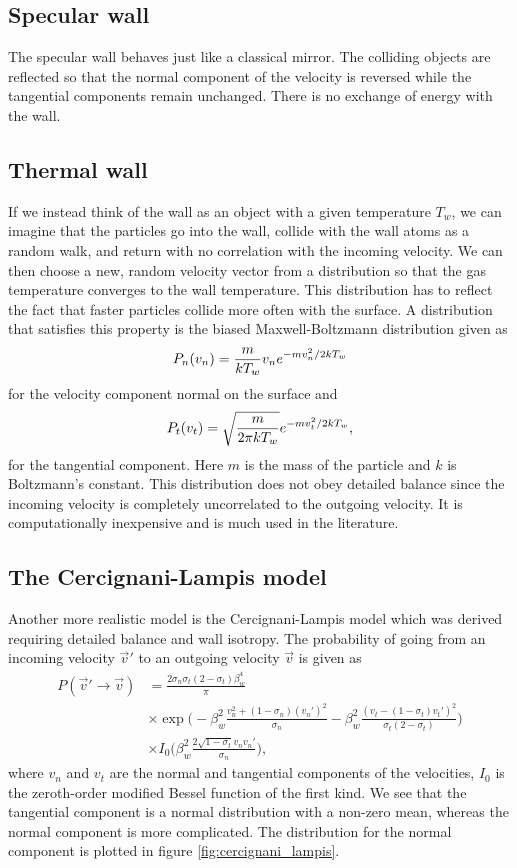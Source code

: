 \subsection{Specular wall}
The specular wall behaves just like a classical mirror. The colliding objects are reflected so that the normal component of the velocity is reversed while the tangential components remain unchanged. There is no exchange of energy with the wall. 

\subsection{Thermal wall}
If we instead think of the wall as an object with a given temperature $T_w$, we can imagine that the particles go into the wall, collide with the wall atoms as a random walk, and return with no correlation with the incoming velocity. We can then choose a new, random velocity vector from a distribution so that the gas temperature converges to the wall temperature. This distribution has to reflect the fact that faster particles collide more often with the surface. A distribution that satisfies this property is the biased Maxwell-Boltzmann distribution given as
\begin{align}
	P_n(v_n) = {m\over kT_w}v_n e^{-mv_n^2/2kT_w}
\end{align}
for the velocity component normal on the surface and
\begin{align}
	P_t(v_t) = \sqrt{m\over 2\pi kT_w}e^{-mv_t^2/2kT_w},
\end{align}
for the tangential component. Here $m$ is the mass of the particle and $k$ is Boltzmann's constant\cite{alexander1997direct}. This distribution does not obey detailed balance since the incoming velocity is completely uncorrelated to the outgoing velocity. It is computationally inexpensive and is much used in the literature. 
\subsection{The Cercignani-Lampis model}
Another more realistic model is the Cercignani-Lampis model which was derived requiring detailed balance and wall isotropy\cite{cowling1974cercignani}. The probability of going from an incoming velocity $\vec v'$ to an outgoing velocity $\vec v$ is given as
\begin{align}
	\nonumber
	P(\vec v'\rightarrow \vec v) &= \frac{2\sigma_n\sigma_t(2-\sigma_t)\beta_w^4}{\pi}\\
	\nonumber
	&\times\exp\Big(-\beta_w^2\frac{v_n^2 + (1-\sigma_n)(v_n')^2}{\sigma_n} - \beta_w^2\frac{(v_t - (1 - \sigma_t)v_t')^2}{\sigma_t(2 - \sigma_t)}\Big)\\
	&\times I_0\Big(\beta_w^2\frac{2\sqrt{1 - \sigma_t}v_nv_n'}{\sigma_n}\Big),
\end{align}
where $v_n$ and $v_t$ are the normal and tangential components of the velocities, $I_0$ is the zeroth-order modified Bessel function of the first kind. We see that the tangential component is a normal distribution with a non-zero mean, whereas the normal component is more complicated. The distribution for the normal component is plotted in figure \ref{fig:cercignani_lampis}.

